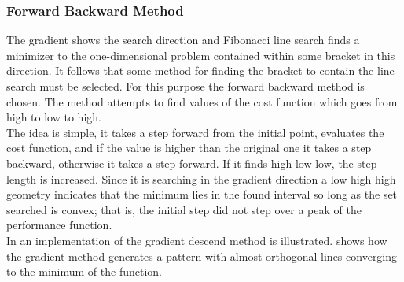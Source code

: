 \subsubsection{Forward Backward Method}
The gradient shows the search direction and Fibonacci line search finds a minimizer to the one-dimensional problem contained within some bracket in this direction. It follows that some method for finding the bracket to contain the line search must be selected. For this purpose the forward backward method is chosen. The method attempts to find values of the cost function which goes from high to low to high.\\
The idea is simple, it takes a step forward from the initial point, evaluates the cost function, and if the value is higher than the original one it takes a step backward, otherwise it takes a step forward. If it finds high low low, the step-length is increased. Since it is searching in the gradient direction a low high high geometry indicates that the minimum lies in the found interval so long as the set searched is convex; that is, the initial step did not step over a peak of the performance function.\\
In  an implementation of the gradient descend method is illustrated.  shows how the gradient method generates a pattern with almost orthogonal lines converging to the minimum of the function.

